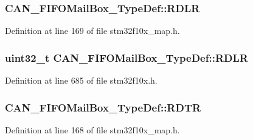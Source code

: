 \subsubsection[{\texorpdfstring{R\+D\+LR}{RDLR}}]{ C\+A\+N\+\_\+\+F\+I\+F\+O\+Mail\+Box\+\_\+\+Type\+Def\+::\+R\+D\+LR}\hypertarget{struct_c_a_n___f_i_f_o_mail_box___type_def_a03b21e6f0bfa72ca9a7bdd7cd5871284}{}\label{struct_c_a_n___f_i_f_o_mail_box___type_def_a03b21e6f0bfa72ca9a7bdd7cd5871284}


Definition at line 169 of file stm32f10x\+\_\+map.\+h.

\subsubsection[{\texorpdfstring{R\+D\+LR}{RDLR}}]{ {\bf uint32\+\_\+t} C\+A\+N\+\_\+\+F\+I\+F\+O\+Mail\+Box\+\_\+\+Type\+Def\+::\+R\+D\+LR}\hypertarget{struct_c_a_n___f_i_f_o_mail_box___type_def_ac7d62861de29d0b4fcf11fabbdbd76e7}{}\label{struct_c_a_n___f_i_f_o_mail_box___type_def_ac7d62861de29d0b4fcf11fabbdbd76e7}


Definition at line 685 of file stm32f10x.\+h.

\subsubsection[{\texorpdfstring{R\+D\+TR}{RDTR}}]{ C\+A\+N\+\_\+\+F\+I\+F\+O\+Mail\+Box\+\_\+\+Type\+Def\+::\+R\+D\+TR}\hypertarget{struct_c_a_n___f_i_f_o_mail_box___type_def_a140124f6a625d35b3d1168f0688056b0}{}\label{struct_c_a_n___f_i_f_o_mail_box___type_def_a140124f6a625d35b3d1168f0688056b0}


Definition at line 168 of file stm32f10x\+\_\+map.\+h.

